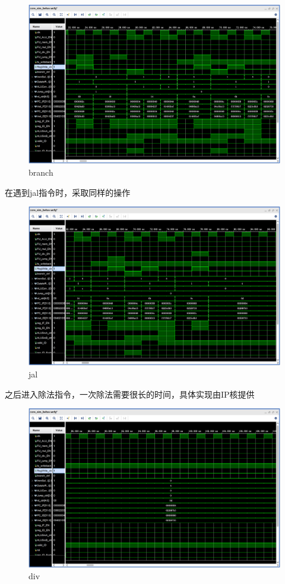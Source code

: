 \begin{figure}[H]
    \centering
    \includegraphics[width=1.0\textwidth]{figs/3.png}
    \caption{branch}
    \label{Fig.6}
\end{figure}

在遇到jal指令时，采取同样的操作

\begin{figure} [H]
    \centering
    \includegraphics[width=1.0\textwidth]{figs/4.png}
    \caption{jal}
    \label{Fig.8}
\end{figure}

之后进入除法指令，一次除法需要很长的时间，具体实现由IP核提供

\begin{figure}[H]
    \centering
    \includegraphics[width=1.0\textwidth]{figs/6.png}
    \caption{div}
    \label{Fig.9}
\end{figure}

